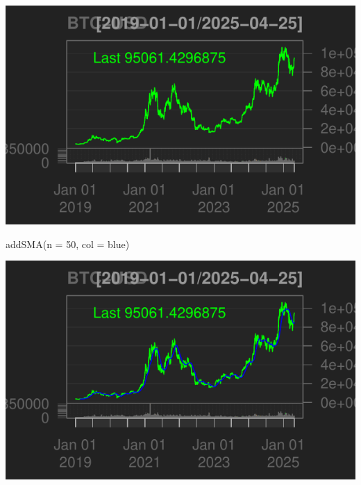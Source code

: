 \documentclass[]{tufte-handout}
\newenvironment{Shaded}{}{}
\newcommand{\AttributeTok}[1]{\textcolor[rgb]{0.49,0.56,0.16}{#1}}
\newcommand{\CommentTok}[1]{\textcolor[rgb]{0.38,0.63,0.69}{\textit{#1}}}
\newcommand{\DecValTok}[1]{\textcolor[rgb]{0.25,0.63,0.44}{#1}}
\newcommand{\FunctionTok}[1]{\textcolor[rgb]{0.02,0.16,0.49}{#1}}
\newcommand{\NormalTok}[1]{#1}
\newcommand{\OtherTok}[1]{\textcolor[rgb]{0.00,0.44,0.13}{#1}}
\newcommand{\SpecialCharTok}[1]{\textcolor[rgb]{0.25,0.44,0.63}{#1}}
\newcommand{\StringTok}[1]{\textcolor[rgb]{0.25,0.44,0.63}{#1}}
\begin{document}
\begin{Shaded}
\end{Shaded}

\includegraphics{cripto_update_files/figure-latex/unnamed-chunk-5-1}

\begin{Shaded}
\begin{Highlighting}[]
\FunctionTok{addSMA}\NormalTok{(}\AttributeTok{n =} \DecValTok{50}\NormalTok{, }\AttributeTok{col =} \StringTok{\textquotesingle{}blue\textquotesingle{}}\NormalTok{)}
\end{Highlighting}
\end{Shaded}

\includegraphics{cripto_update_files/figure-latex/unnamed-chunk-5-2}
\end{document}

